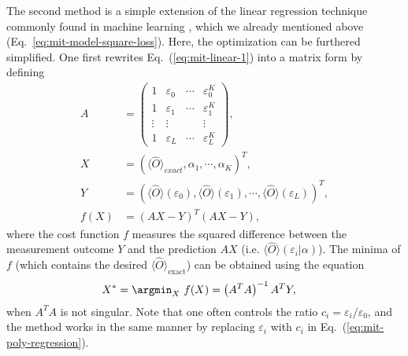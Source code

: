 The second method is a simple extension of the linear regression technique commonly found in machine learning \cite{hastie2015statistical}, which we already mentioned above (Eq.~\ref{eq:mit-model-square-loss}). Here, the optimization can be furthered simplified. One first rewrites Eq.~(\ref{eq:mit-linear-1}) into a matrix form by defining
\begin{equation}
    \begin{split}
        \label{eq:mit-poly-regression}
        A & =\begin{pmatrix}
            1      & \varepsilon _{0} & \cdots & \varepsilon _{0}^{K} \\
            1      & \varepsilon _{1} & \cdots & \varepsilon _{1}^{K} \\
            \vdots & \vdots           &        & \vdots               \\
            1      & \varepsilon _{L} & \cdots & \varepsilon _{L}^{K}
        \end{pmatrix} ,\\
        X & =( \langle \hat{O} \rangle_{exact} ,\alpha _{1} ,\cdots ,\alpha _{K})^{T} ,\\
        Y & =( \langle \hat{O} \rangle( \varepsilon _{0}) ,\langle \hat{O} \rangle( \varepsilon _{1}) ,\cdots ,\langle \hat{O} \rangle( \varepsilon _{L}))^{T} ,\\
        f( X) & =( AX-Y)^{T}( AX-Y) ,
    \end{split}
\end{equation}
where the cost function $f$ measures the squared difference between the measurement outcome $Y$ and the prediction $AX$ (i.e. $\langle \hat{O} \rangle( \varepsilon _{i} |\alpha )$). The minima of $f$ (which contains the desired $\langle \hat{O} \rangle_{\mathrm{exact}}$) can be obtained using the equation \cite{hastie2015statistical}
\begin{equation}
    \begin{split}
        X^{*} & =\argmin_{X} \ f( X) =\left( A^{T} A\right)^{-1} A^{T} Y,
    \end{split}
\end{equation}
when $A^{T} A$ is not singular. Note that one often controls the ratio $c_{i} =\varepsilon _{i} /\varepsilon _{0}$, and the method works in the same manner by replacing $\varepsilon _{i}$ with $c_{i}$ in Eq.~(\ref{eq:mit-poly-regression}).

